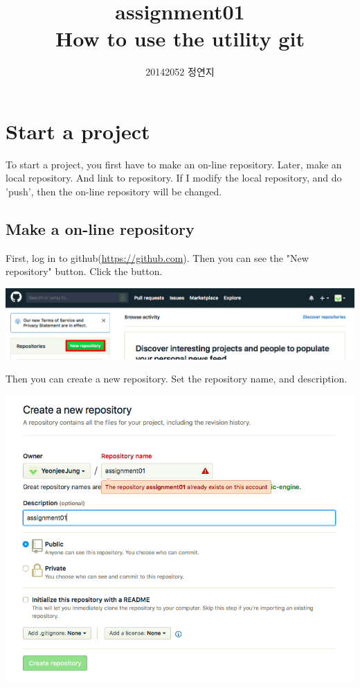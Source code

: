 \documentclass{article}
\title{
    assignment01\\
    \large How to use the utility git
    }
\author{20142052 정연지}
\date{}
\begin{document}
\maketitle

\section{Start a project}

To start a project, you first have to make an on-line repository. Later, make an local repository. And link to repository. If I modify the local repository, and do 'push', then the on-line repository will be changed.

\subsection{Make a on-line repository}

First, log in to github(\href{https://github.com}{https://github.com}). Then you can see the "New repository" button. Click the button.
\begin{center}
    \includegraphics[scale=0.4]{pic/pic1.png}
\end{center}

Then you can create a new repository. Set the repository name, and description.
\begin{center}
    \includegraphics[scale = 0.6]{pic/pic2.png}
\end{center}
\end{document}
